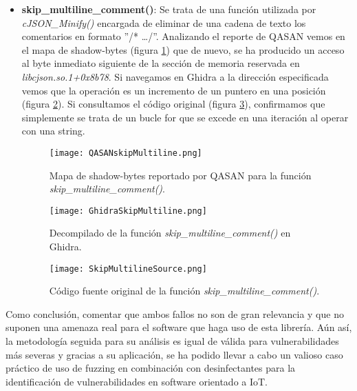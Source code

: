 \begin{itemize}
    \item \textbf{skip\_multiline\_comment()}: Se trata de una función utilizada por \textit{cJSON\_Minify()} encargada de eliminar de una cadena de texto
    los comentarios en formato ''/* \dots */''. Analizando el reporte de QASAN vemos en el mapa de shadow-bytes (figura \ref{fig:QASANskipMultiline}) que de nuevo,
    se ha producido un acceso al byte inmediato siguiente de la sección de memoria reservada en \textit{libcjson.so.1+0x8b78}. Si navegamos en Ghidra a la 
    dirección especificada vemos que la operación es un incremento de un puntero en una posición (figura \ref{fig:GhidraSkipMultiline}). Si consultamos el 
    código original (figura \ref{fig:SkipMultilineSource}), confirmamos que simplemente se trata de un bucle for que se excede en una iteración al operar con una string.

    \begin{figure}[H]
        \centering
        \texttt{[image: QASANskipMultiline.png]}
        \caption{Mapa de shadow-bytes reportado por QASAN para la función \textit{skip\_multiline\_comment()}.}
        \label{fig:QASANskipMultiline}
    \end{figure}

    \begin{figure}[H]
        \centering
        \texttt{[image: GhidraSkipMultiline.png]}
        \caption{Decompilado de la función \textit{skip\_multiline\_comment()} en Ghidra.}
        \label{fig:GhidraSkipMultiline}
    \end{figure}

    \begin{figure}[H]
        \centering
        \texttt{[image: SkipMultilineSource.png]}
        \caption{Código fuente original de la función \textit{skip\_multiline\_comment()}.}
        \label{fig:SkipMultilineSource}
    \end{figure}
\end{itemize}

Como conclusión, comentar que ambos fallos no son de gran relevancia y que no suponen una amenaza real para el software que haga uso de esta librería.
Aún así, la metodología seguida para su análisis es igual de válida para vulnerabilidades más severas y gracias a su aplicación, se ha podido 
llevar a cabo un valioso caso práctico de uso de fuzzing en combinación con desinfectantes para la identificación de vulnerabilidades en software orientado 
a IoT.
